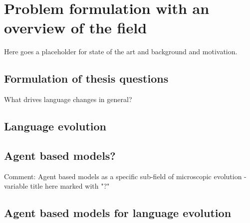 \section{Problem formulation with an overview of the field}
Here goes a placeholder for state of the art and background and motivation.

\subsection{Formulation of thesis questions}

What drives language changes in general?

\subsection{Language evolution}

\subsection{Agent based models?}
Comment: Agent based models as a specific sub-field of microscopic evolution - variable title here marked with "?"

\subsection{Agent based models for language evolution}
